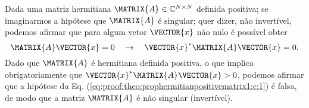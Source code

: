 \begin{myproofT}\label{proof:theo:prophermitianpositivematrix1:c}
Dada uma matriz hermitiana $\MATRIX{A} \in \mathbb{C}^{N \times N}$ definida positiva;
se imaginarmos a hipótese que $\MATRIX{A}$ é singular; quer dizer, não invertível,
podemos afirmar que para algum vetor $\VECTOR{x}$ não nulo
é possível obter
\begin{equation}\label{eq:proof:theo:prophermitianpositivematrix1:c:1}
\MATRIX{A}\VECTOR{x}= 0 
\quad \rightarrow \quad
\VECTOR{x}^{\ast} \MATRIX{A} \VECTOR{x}= 0.
\end{equation}
Dado que $\MATRIX{A}$ é hermitiana definida positiva, 
o que implica obrigatoriamente que $\VECTOR{x}^{\ast} \MATRIX{A} \VECTOR{x}>0$,
podemos afirmar que a hipótese da Eq. (\ref{eq:proof:theo:prophermitianpositivematrix1:c:1}) é falsa, 
de modo que a matriz $\MATRIX{A}$ é não singular (invertível).
\end{myproofT}


